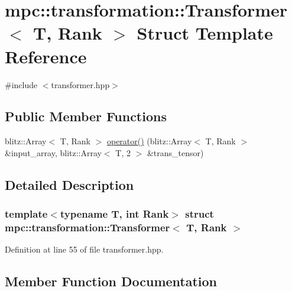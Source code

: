 \hypertarget{structmpc_1_1transformation_1_1_transformer}{}\section{mpc\+:\+:transformation\+:\+:Transformer$<$ T, Rank $>$ Struct Template Reference}
\label{structmpc_1_1transformation_1_1_transformer}


{\ttfamily \#include $<$transformer.\+hpp$>$}

\subsection*{Public Member Functions}
\begin{DoxyCompactItemize}
\item 
blitz\+::\+Array$<$ T, Rank $>$ \mbox{\hyperlink{structmpc_1_1transformation_1_1_transformer_a4edd2d6c0e14fba6f38d84668a42d20e}{operator()}} (blitz\+::\+Array$<$ T, Rank $>$ \&input\+\_\+array, blitz\+::\+Array$<$ T, 2 $>$ \&trans\+\_\+tensor)
\end{DoxyCompactItemize}


\subsection{Detailed Description}
\subsubsection*{template$<$typename T, int Rank$>$\newline
struct mpc\+::transformation\+::\+Transformer$<$ T, Rank $>$}



Definition at line 55 of file transformer.\+hpp.



\subsection{Member Function Documentation}
\mbox{\label{structmpc_1_1transformation_1_1_transformer_a4edd2d6c0e14fba6f38d84668a42d20e}} 
